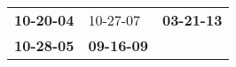 \begin{supertabular}{p{0.33\columnwidth}p{0.33\columnwidth}p{0.33\columnwidth}}
 \textbf{10-20-04\textsuperscript{}} &           10-27-07\textsuperscript{} &  \textbf{03-21-13\textsuperscript{}} \\
 \textbf{10-28-05\textsuperscript{}} &  \textbf{09-16-09\textsuperscript{}} &                                      \\
\end{supertabular}
